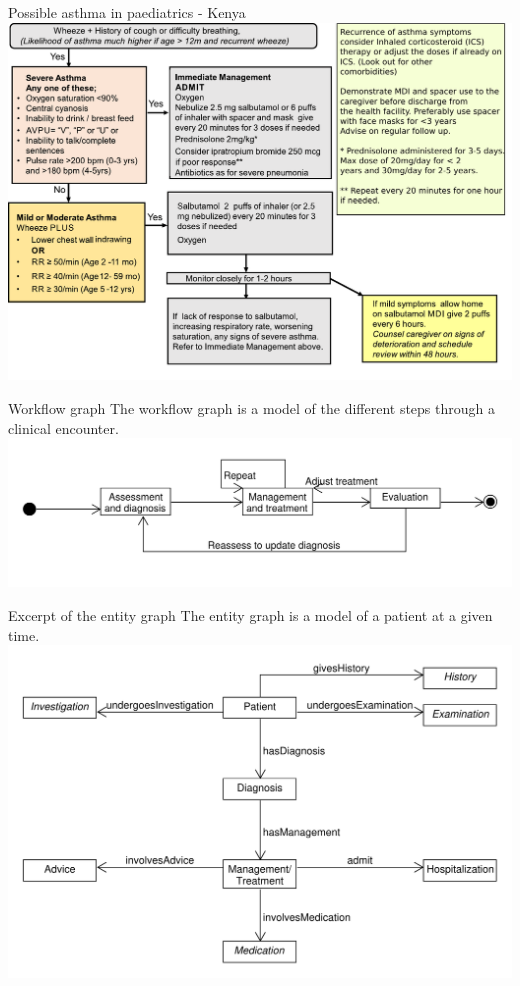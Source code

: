 \documentclass{beamer}
\begin{document}
\begin{frame}{Possible asthma in paediatrics - Kenya}
\includegraphics[scale=0.45]{KenyaCPG}
\end{frame}

\begin{frame}{Workflow graph}
The workflow graph is a model of the different steps through a clinical encounter.
\includegraphics[scale=0.44]{WorkflowGraph}
\end{frame}

\begin{frame}{Excerpt of the entity graph}
The entity graph is a model of a patient at a given time.
\includegraphics[scale=0.45]{SimpleEntityGraph}
\end{frame}
\end{document}
